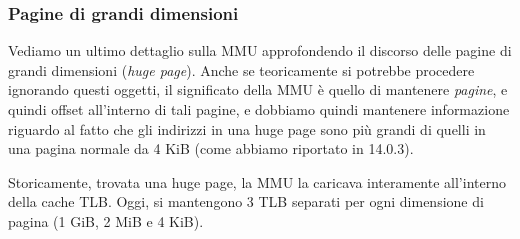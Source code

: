 \documentclass[a4paper,11pt]{article}
\begin{document}
\subsubsection{Pagine di grandi dimensioni}
Vediamo un ultimo dettaglio sulla MMU approfondendo il discorso delle pagine di grandi dimensioni (\textit{huge page}).
Anche se teoricamente si potrebbe procedere ignorando questi oggetti, il significato della MMU è quello di mantenere \textit{pagine}, e quindi offset all'interno di tali pagine, e dobbiamo quindi mantenere informazione riguardo al fatto che gli indirizzi in una huge page sono più grandi di quelli in una pagina normale da 4 KiB (come abbiamo riportato in 14.0.3).

Storicamente, trovata una huge page, la MMU la caricava interamente all'interno della cache TLB.
Oggi, si mantengono 3 TLB separati per ogni dimensione di pagina (1 GiB, 2 MiB e 4 KiB).
\end{document}
